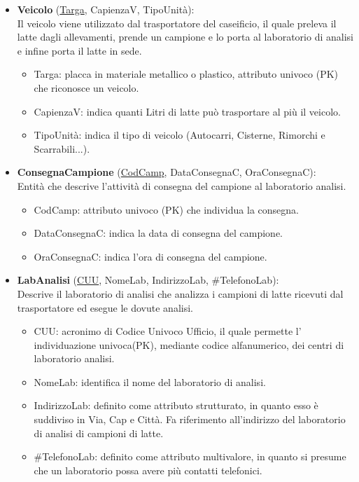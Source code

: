 \documentclass[12pt]{report}
\begin{document}
\begin{itemize}
\item \textbf{Veicolo} (\underline{Targa}, CapienzaV, TipoUnità):\\
Il veicolo viene utilizzato dal trasportatore del caseificio, il quale preleva il latte dagli allevamenti, prende un campione e lo porta al laboratorio di analisi e infine porta il latte in sede.
\begin{itemize}
\item Targa: placca in materiale metallico o plastico, attributo univoco (PK) che riconosce un veicolo.
\item CapienzaV: indica quanti Litri di latte può trasportare al più il veicolo.
\item TipoUnità: indica il tipo di veicolo (Autocarri, Cisterne, Rimorchi e Scarrabili...).

\end{itemize}

\item \textbf{ConsegnaCampione} (\underline{CodCamp}, DataConsegnaC, OraConsegnaC):\\
Entità che descrive l'attività di consegna del campione al laboratorio analisi.
\begin{itemize}
\item CodCamp: attributo univoco (PK) che individua la consegna.
\item DataConsegnaC: indica la data di consegna del campione.
\item  OraConsegnaC: indica l'ora di consegna del campione.
\end{itemize}



\item \textbf{LabAnalisi} (\underline{CUU}, NomeLab, IndirizzoLab, \#TelefonoLab):\\
	Descrive il laboratorio di analisi che analizza i campioni di latte ricevuti dal trasportatore ed esegue le dovute analisi.
	\begin{itemize}
		\item CUU: acronimo di Codice Univoco Ufficio, il quale permette l’ individuazione univoca(PK), mediante codice alfanumerico, dei centri di laboratorio analisi.
		\item NomeLab: identifica il nome del laboratorio di analisi.
		\item IndirizzoLab: definito come attributo strutturato, in quanto esso è suddiviso in Via, Cap e Città. Fa riferimento all’indirizzo del laboratorio di analisi di campioni di latte.
		\item \#TelefonoLab: definito come attributo multivalore, in quanto si presume che un laboratorio possa avere più contatti telefonici.


\end{itemize}
\end{itemize}
\end{document}
